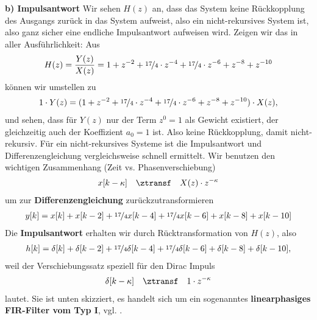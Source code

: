 \begin{ExCalc}
\textbf{b) Impulsantwort}
Wir sehen $H(z)$ an, dass das System keine Rückkopplung des Ausgangs zurück in
das System aufweist, also ein nicht-rekursives System ist, also ganz sicher
eine endliche Impulsantwort aufweisen wird.
%
Zeigen wir das in aller Ausführlichkeit: Aus
\begin{align}
H(z) = \frac{Y(z)}{X(z)}
= 1            + z^{-2} + \nicefrac{17}{4}\cdot z^{-4}  + \nicefrac{17}{4}\cdot z^{-6} + z^{-8} + z^{-10}
\end{align}
können wir umstellen zu
\begin{align}
1 \cdot Y(z)
= (1            + z^{-2} + \nicefrac{17}{4}\cdot z^{-4}  + \nicefrac{17}{4}\cdot z^{-6} + z^{-8} + z^{-10})
\cdot X(z),
\end{align}
und sehen, dass für $Y(z)$ nur der Term $z^0=1$ als Gewicht existiert, der gleichzeitig
auch der Koeffizient $a_0=1$ ist. Also keine Rückkopplung, damit nicht-rekursiv.
%
Für ein nicht-rekursives Systeme ist die Impulsantwort und Differenzengleichung
vergleichsweise schnell ermittelt.
%
Wir benutzen den wichtigen Zusammenhang (Zeit vs. Phasenverschiebung)
\begin{align}
x[k-\kappa] \quad\ztransf\quad X(z) \cdot z^{-\kappa}
\end{align}
um zur \textbf{Differenzengleichung} zurückzutransformieren
\begin{align}
y[k] = x[k] + x[k-2] + \nicefrac{17}{4} x[k-4] + \nicefrac{17}{4} x[k-6] + x[k-8] + x[k-10]
\end{align}
Die \textbf{Impulsantwort} erhalten wir durch Rücktransformation von $H(z)$, also
\begin{align}
h[k] = \delta[k] + \delta[k-2] + \nicefrac{17}{4} \delta[k-4] + \nicefrac{17}{4} \delta[k-6] + \delta[k-8] + \delta[k-10],
\end{align}
weil der Verschiebungssatz speziell für den Dirac Impuls
\begin{align}
\delta[k-\kappa] \quad\ztransf\quad 1 \cdot z^{-\kappa}
\end{align}
lautet. Sie ist unten skizziert, es handelt sich um ein sogenanntes
\textbf{linearphasiges FIR-Filter vom Typ I}, vgl. \cite{Oppenheim2010, Oppenheim2004}.
%
\begin{center}
\end{center}
\end{ExCalc}
